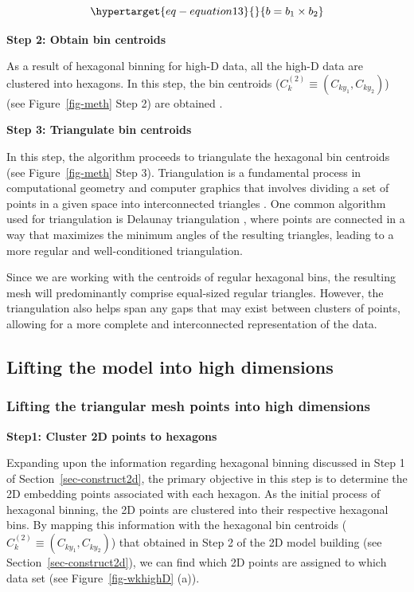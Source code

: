 \documentclass[
  12pt]{article}
\begin{document}
\begin{equation}\protect\hypertarget{eq-equation13}{}{
b = b_1 \times b_2
}\label{eq-equation13}\end{equation}

\textbf{Step 2: Obtain bin centroids}

As a result of hexagonal binning for high-D data, all the high-D data
are clustered into hexagons. In this step, the bin centroids
(\(C_k^{(2)} \equiv (C_{ky_1}, C_{ky_2})\)) (see Figure~\ref{fig-meth}
Step 2) are obtained \citep{Carr2013}.

\textbf{Step 3: Triangulate bin centroids}

In this step, the algorithm proceeds to triangulate the hexagonal bin
centroids (see Figure~\ref{fig-meth} Step 3). Triangulation is a
fundamental process in computational geometry and computer graphics that
involves dividing a set of points in a given space into interconnected
triangles \citep{article30}. One common algorithm used for triangulation
is Delaunay triangulation \citep[\citet{article54}]{article26}, where
points are connected in a way that maximizes the minimum angles of the
resulting triangles, leading to a more regular and well-conditioned
triangulation.

Since we are working with the centroids of regular hexagonal bins, the
resulting mesh will predominantly comprise equal-sized regular
triangles. However, the triangulation also helps span any gaps that may
exist between clusters of points, allowing for a more complete and
interconnected representation of the data.

\hypertarget{lifting-the-model-into-high-dimensions}{%
\subsection{Lifting the model into high
dimensions}\label{lifting-the-model-into-high-dimensions}}

\hypertarget{lifting-the-triangular-mesh-points-into-high-dimensions}{%
\subsubsection{Lifting the triangular mesh points into high
dimensions}\label{lifting-the-triangular-mesh-points-into-high-dimensions}}

\textbf{Step1: Cluster 2D points to hexagons}

Expanding upon the information regarding hexagonal binning discussed in
Step 1 of Section~\ref{sec-construct2d}, the primary objective in this
step is to determine the 2D embedding points associated with each
hexagon. As the initial process of hexagonal binning, the 2D points are
clustered into their respective hexagonal bins. By mapping this
information with the hexagonal bin centroids
(\(C_k^{(2)} \equiv (C_{ky_1}, C_{ky_2})\)) that obtained in Step 2 of
the 2D model building (see Section~\ref{sec-construct2d}), we can find
which 2D points are assigned to which data set (see
Figure~\ref{fig-wkhighD} (a)).
\end{document}
